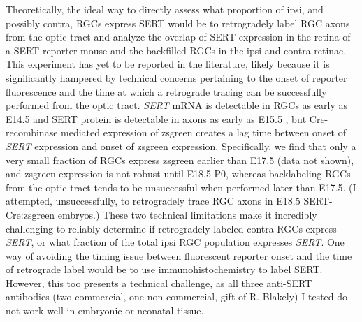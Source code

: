 Theoretically, the ideal way to directly assess what proportion of ipsi, and possibly contra, RGCs express SERT would be to retrogradely label RGC axons from the optic tract and analyze the overlap of SERT expression in the retina of a SERT reporter mouse and the backfilled RGCs in the ipsi and contra retinae.
This experiment has yet to be reported in the literature, likely because it is significantly hampered by technical concerns pertaining to the onset of reporter fluorescence and the time at which a retrograde tracing can be successfully performed from the optic tract.
\emph{SERT} mRNA is detectable in RGCs as early as E14.5 \cite{garcia2010zic2} and SERT protein is detectable in axons as early as E15.5 \cite{upton1999excess}, but Cre-recombinase mediated expression of zsgreen creates a lag time between onset of \emph{SERT} expression and onset of zsgreen expression.
Specifically, we find that only a very small fraction of RGCs express zsgreen earlier than E17.5 (data not shown), and zsgreen expression is not robust until E18.5-P0, whereas backlabeling RGCs from the optic tract tends to be unsuccessful when performed later than E17.5.
(I attempted, unsuccessfully, to retrogradely trace RGC axons in E18.5 SERT-Cre:zsgreen embryos.)
These two technical limitations make it incredibly challenging to reliably determine if retrogradely labeled contra RGCs express \emph{SERT}, or what fraction of the total ipsi RGC population expresses \emph{SERT}.
One way of avoiding the timing issue between fluorescent reporter onset and the time of retrograde label would be to use immunohistochemistry to label SERT.
However, this too presents a technical challenge, as all three anti-SERT antibodies (two commercial, one non-commercial, gift of R. Blakely) I tested do not work well in embryonic or neonatal tissue.

